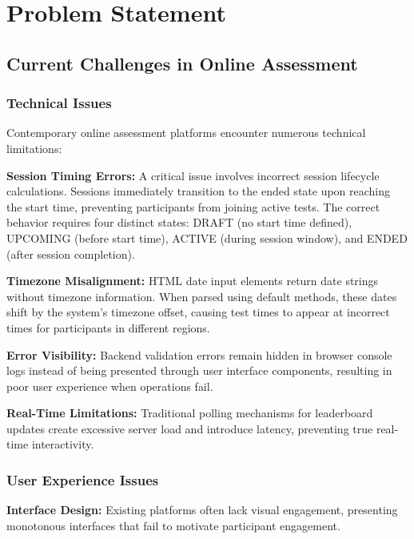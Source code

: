 \documentclass[12pt,a4paper]{report}
\begin{document}
\cleardoublepage


\chapter{Problem Statement}

\section{Current Challenges in Online Assessment}

\subsection{Technical Issues}

Contemporary online assessment platforms encounter numerous technical limitations:

\textbf{Session Timing Errors:} A critical issue involves incorrect session lifecycle calculations. Sessions immediately transition to the ended state upon reaching the start time, preventing participants from joining active tests. The correct behavior requires four distinct states: DRAFT (no start time defined), UPCOMING (before start time), ACTIVE (during session window), and ENDED (after session completion).

\textbf{Timezone Misalignment:} HTML date input elements return date strings without timezone information. When parsed using default methods, these dates shift by the system's timezone offset, causing test times to appear at incorrect times for participants in different regions.

\textbf{Error Visibility:} Backend validation errors remain hidden in browser console logs instead of being presented through user interface components, resulting in poor user experience when operations fail.

\textbf{Real-Time Limitations:} Traditional polling mechanisms for leaderboard updates create excessive server load and introduce latency, preventing true real-time interactivity.

\subsection{User Experience Issues}

\textbf{Interface Design:} Existing platforms often lack visual engagement, presenting monotonous interfaces that fail to motivate participant engagement.
\end{document}
